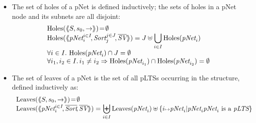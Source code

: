 \documentclass{llncs}
\begin{document}
\begin{definition}
\begin{itemize}
\item
The set of holes of a pNet is defined inductively; the sets of holes
in a pNet node and its subnets are all disjoint:
  \[\begin{array}{l}
\Holes(\mylangle S,s_0, \to\myrangle) \!=\! \emptyset \\
\Holes(\mylangle \pNet_i^{i\in I}\!,\Sort_j^{j\in J}\!, \overline{\symb{SV}}\myrangle) 
=J\uplus{\displaystyle \bigcup_{i\in 
I}\Holes(\pNet_i)}\\
\forall i\in I.\, \Holes(\pNet_i)\cap J=\emptyset\\
\forall i_1,i_2\in I.\,i_1\neq i_2\Rightarrow  
\Holes(\pNet_{i_1})\cap\Holes(\pNet_{i_2})=\emptyset
\end{array}\]
\item
The set of leaves of a pNet is the set of all pLTSs occurring in the structure, defined 
inductively as:
\[\begin{array}{l}
\Leaves(\mylangle S,s_0, \to\myrangle) \!=\!\emptyset\\%
\Leaves(\mylangle \pNet_i^{i\in I}\!,%
\overline{\Sort}\!, \overline{\symb{SV}}\myrangle) = {\displaystyle \biguplus_{i\in 
I}\Leaves(\pNet_i)\uplus\{i\mapsto \pNet_i|\pNet_i\pNet_i \text{ is a }\pLTS\}}
\end{array}\]
\end{itemize}
\end{definition}
\end{document}

